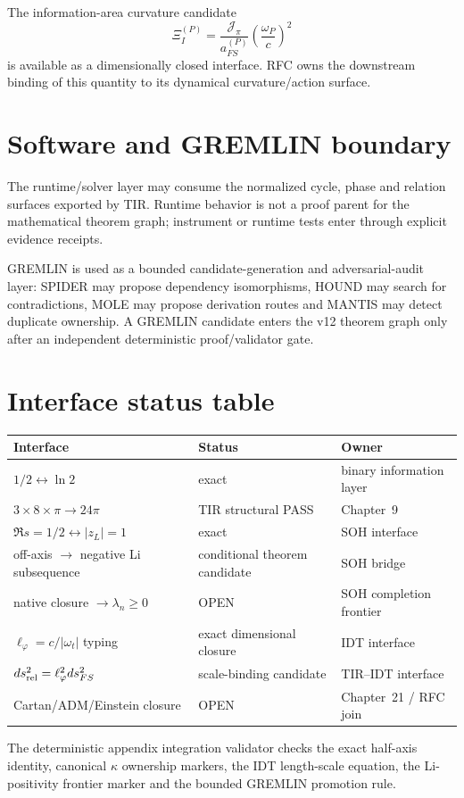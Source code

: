 The information-area curvature candidate
\[
\Xi_I^{(P)}
=
\frac{\mathcal J_\pi}{a_{FS}^{(P)}}
\left(\frac{\omega_P}{c}\right)^2
\]
is available as a dimensionally closed interface.  RFC owns the downstream
binding of this quantity to its dynamical curvature/action surface.

\section{Software and GREMLIN boundary}

The runtime/solver layer may consume the normalized cycle, phase and relation
surfaces exported by TIR.  Runtime behavior is not a proof parent for the
mathematical theorem graph; instrument or runtime tests enter through explicit
evidence receipts.

GREMLIN is used as a bounded candidate-generation and adversarial-audit layer:
SPIDER may propose dependency isomorphisms, HOUND may search for contradictions,
MOLE may propose derivation routes and MANTIS may detect duplicate ownership.
A GREMLIN candidate enters the v12 theorem graph only after an independent
deterministic proof/validator gate.

\section{Interface status table}

\begin{center}
\begin{tabular}{p{}p{}p{}}
\toprule
Interface & Status & Owner\\
\midrule
\(1/2\leftrightarrow\ln2\) & exact & binary information layer\\
\(3\times8\times\pi\to24\pi\) & TIR structural PASS & Chapter~9\\
\(\Re s=1/2\leftrightarrow|z_L|=1\) & exact & SOH interface\\
off-axis \(\to\) negative Li subsequence & conditional theorem candidate & SOH bridge\\
native closure \(\to\lambda_n\ge0\) & OPEN & SOH completion frontier\\
\(\ell_\varphi=c/|\omega_t|\) typing & exact dimensional closure & IDT interface\\
\(ds_{\rm rel}^2=\ell_\varphi^2ds_{FS}^2\) & scale-binding candidate & TIR--IDT interface\\
Cartan/ADM/Einstein closure & OPEN & Chapter~21 / RFC join\\
\bottomrule
\end{tabular}
\end{center}

The deterministic appendix integration validator checks the exact half-axis
identity, canonical \(\kappa\) ownership markers, the IDT length-scale equation,
the Li-positivity frontier marker and the bounded GREMLIN promotion rule.

\clearpage
